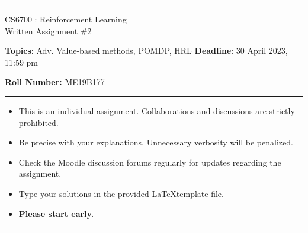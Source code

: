 \documentclass[addpoints,12pt,solution]{exam}
\begin{document}
    \hrule
    \vspace{1mm}
    \noindent
    \begin{center}
    {\Large CS6700 : Reinforcement Learning \\ \large Written Assignment \#2}
    \end{center}
    \vspace{1mm}
    \noindent
    {\footnotesize \textbf{Topics}: Adv. Value-based methods, POMDP, HRL \hfill \textbf{Deadline}: 30 April 2023, 11:59 pm}

      \hfill {\textbf{Roll Number:} ME19B177}

    \vspace{2mm}
    \hrule

    {\small

        \begin{itemize}
            \itemsep0mm
            \item This is an individual assignment. Collaborations and discussions are strictly
            prohibited.
            \item Be precise with your explanations. Unnecessary verbosity will be penalized.
            \item Check the Moodle discussion forums regularly for updates regarding the assignment.
            \item Type your solutions in the provided \LaTeX template file.
            \item \textbf{Please start early.}
        \end{itemize}
    }

    \hrule

    \vspace{3mm}


\end{document}
